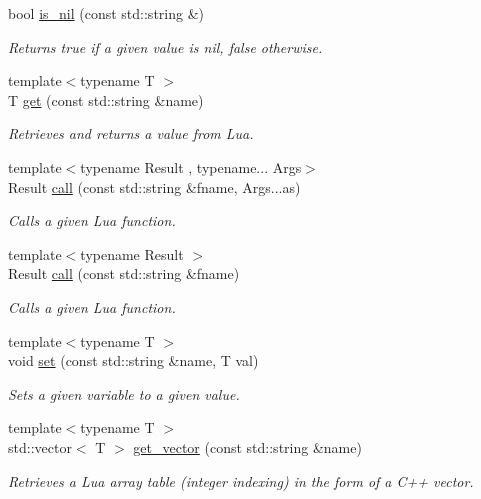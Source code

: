 \begin{DoxyCompactItemize}
bool \hyperlink{classlpp_1_1_script_ae03581ef0b1ce4c639f2f592e332d3bd}{is\+\_\+nil} (const std\+::string \&)
\begin{DoxyCompactList}\small\item\em Returns true if a given value is nil, false otherwise. \end{DoxyCompactList}\item 
{\footnotesize template$<$typename T $>$ }\\T \hyperlink{classlpp_1_1_script_a183b83008d4b2647b0b45b4bf94f25bd}{get} (const std\+::string \&name)
\begin{DoxyCompactList}\small\item\em Retrieves and returns a value from Lua. \end{DoxyCompactList}\item 
{\footnotesize template$<$typename Result , typename... Args$>$ }\\Result \hyperlink{classlpp_1_1_script_a58c51f17a5ed784dca84a156da7d98ec}{call} (const std\+::string \&fname, Args...\+as)
\begin{DoxyCompactList}\small\item\em Calls a given Lua function. \end{DoxyCompactList}\item 
{\footnotesize template$<$typename Result $>$ }\\Result \hyperlink{classlpp_1_1_script_a2f11bea50dfdb331923f552ca42a4aec}{call} (const std\+::string \&fname)
\begin{DoxyCompactList}\small\item\em Calls a given Lua function. \end{DoxyCompactList}\item 
{\footnotesize template$<$typename T $>$ }\\void \hyperlink{classlpp_1_1_script_ad92d15b3c9342b9c455de30a3cf321df}{set} (const std\+::string \&name, T val)
\begin{DoxyCompactList}\small\item\em Sets a given variable to a given value. \end{DoxyCompactList}\item 
{\footnotesize template$<$typename T $>$ }\\std\+::vector$<$ T $>$ \hyperlink{classlpp_1_1_script_a8ca0dab497f114069dd28a14eab957aa}{get\+\_\+vector} (const std\+::string \&name)
\begin{DoxyCompactList}\small\item\em Retrieves a Lua array table (integer indexing) in the form of a C++ vector. \end{DoxyCompactList}\item 

\end{DoxyCompactItemize}
